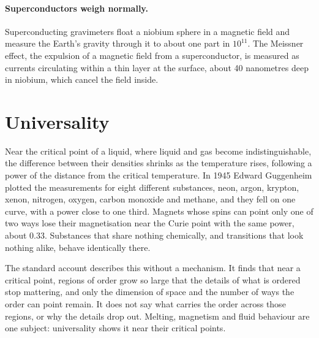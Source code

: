 \documentclass[11pt,a4paper]{article}
\begin{document}
\paragraph{Superconductors weigh normally.} Superconducting gravimeters float a niobium sphere in a magnetic field and measure the Earth's gravity through it to about one part in $10^{11}$. The Meissner effect, the expulsion of a magnetic field from a superconductor, is measured as currents circulating within a thin layer at the surface, about 40 nanometres deep in niobium, which cancel the field inside. 

\section{Universality}
\label{sec:universality}

 Near the critical point of a liquid, where liquid and gas become indistinguishable, the difference between their densities shrinks as the temperature rises, following a power of the distance from the critical temperature. In 1945 Edward Guggenheim plotted the measurements for eight different substances, neon, argon, krypton, xenon, nitrogen, oxygen, carbon monoxide and methane, and they fell on one curve, with a power close to one third. Magnets whose spins can point only one of two ways lose their magnetisation near the Curie point with the same power, about 0.33. Substances that share nothing chemically, and transitions that look nothing alike, behave identically there.

The standard account describes this without a mechanism. It finds that near a critical point, regions of order grow so large that the details of what is ordered stop mattering, and only the dimension of space and the number of ways the order can point remain. It does not say what carries the order across those regions, or why the details drop out.  Melting, magnetism and fluid behaviour are one subject: universality shows it near their critical points.
\end{document}
